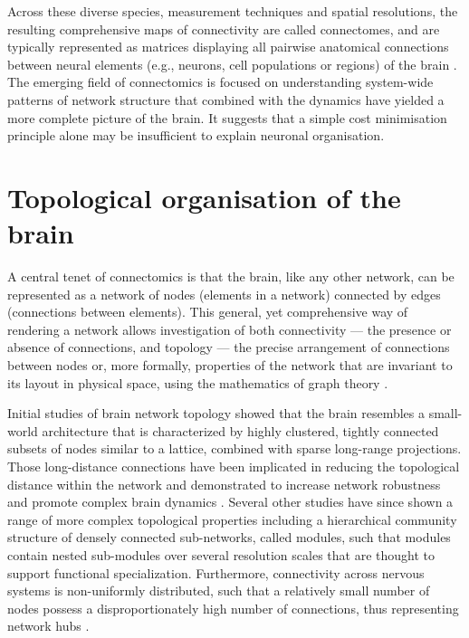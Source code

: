 Across these diverse species, measurement techniques and spatial resolutions, the resulting comprehensive maps of connectivity are called connectomes, and are typically represented as matrices displaying all pairwise anatomical connections between neural elements (e.g., neurons, cell populations or regions) of the brain \citep{Sporns2005}. The emerging field of connectomics is focused on understanding system-wide patterns of network structure that combined with the dynamics have yielded a more complete picture of the brain. It suggests that a simple cost minimisation principle alone may be insufficient to explain neuronal organisation.

\section{Topological organisation of the brain}

A central tenet of connectomics is that the brain, like any other network, can be represented as a network of nodes (elements in a network) connected by edges (connections between elements). This general, yet comprehensive way of rendering a network allows investigation of both connectivity --- the presence or absence of connections, and topology --- the precise arrangement of connections between nodes or, more formally, properties of the network that are invariant to its layout in physical space, using the mathematics of graph theory \citep{Barabasi2016}.

Initial studies of brain network topology showed that the brain resembles a small-world architecture \citep{Bassett2006,Gygi1999,Hilgetag2004,Sporns2004,Watts1998} that is characterized by highly clustered, tightly connected subsets of nodes similar to a lattice, combined with sparse long-range projections. Those long-distance connections have been implicated in reducing the topological distance within the network \mbox{\citep{Bullmore2012,Sporns2004,VandenHeuvel2011}} and demonstrated to increase network robustness and promote complex brain dynamics \citep{Betzel2018}. Several other studies have since shown a range of more complex topological properties including a hierarchical community structure of densely connected sub-networks, called modules, such that modules contain nested sub-modules over several resolution scales \citep{Bullmore1997,Meunier2010a,Towlson2013} that are thought to support functional specialization. Furthermore, connectivity across nervous systems is non-uniformly distributed, such that a relatively small number of nodes possess a disproportionately high number of connections, thus representing network hubs \mbox{\citep{Towlson2013,VandenHeuvel2011}}.

